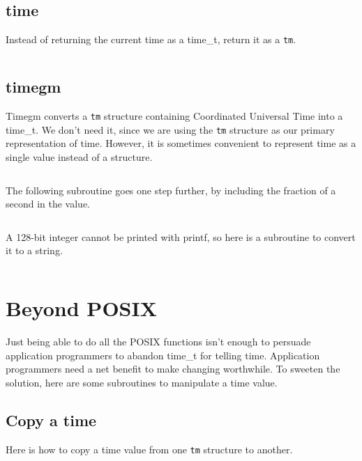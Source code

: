 \documentclass[letterpaper,twoside]{article}
\begin{document}
\subsection{time}
Instead of returning the current time as a {\ttfamily time\_t}, return it as
a \verb|tm|.
\inputminted[firstline=34]{c}{time_current_tm.c}

\subsection{timegm}
Timegm converts a \verb|tm| structure containing Coordinated Universal Time
into a {\ttfamily time\_t}.
We don't need it, since we are using the \verb|tm| structure
as our primary representation of time.  However, it is sometimes
convenient to represent time as a single value instead of a structure.
\inputminted[firstline=32]{c}{time_tm_to_integer.c}

The following subroutine goes one step further, by including the
fraction of a second in the value.
\inputminted[firstline=32]{c}{time_tm_nano_to_integer.c}

A 128-bit integer cannot be printed with printf, so here is a subroutine
to convert it to a string.
\inputminted[firstline=32]{c}{int128_to_string.c}

\section{Beyond POSIX}
Just being able to do all the POSIX functions isn't enough to persuade
application programmers to abandon {\ttfamily time\_t} for telling time.
Application programmers
need a net benefit to make changing worthwhile.  To sweeten the solution,
here are some subroutines to manipulate a time value.

\subsection{Copy a time}
\label{subsection:copy}
Here is how to copy a time value from one \verb|tm| structure to another.
\inputminted[firstline=34]{c}{time_copy.c}
\end{document}
